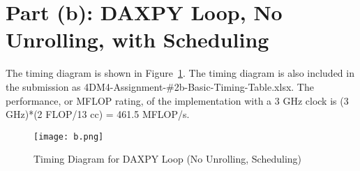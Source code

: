 \section*{Part (b): DAXPY Loop, No Unrolling, with Scheduling}
The timing diagram is shown in Figure~\ref{fig:b}. The timing diagram is also included in the submission as 4DM4-Assignment-\#2b-Basic-Timing-Table.xlsx. The performance, or MFLOP rating, of the implementation with a 3 GHz clock is (3 GHz)*(2 FLOP/13 cc) = 461.5 MFLOP/s.

\begin{figure}[htp]
\centering
\caption{Timing Diagram for DAXPY Loop (No Unrolling, Scheduling)}
\texttt{[image: b.png]}
\label{fig:b}
\end{figure}
